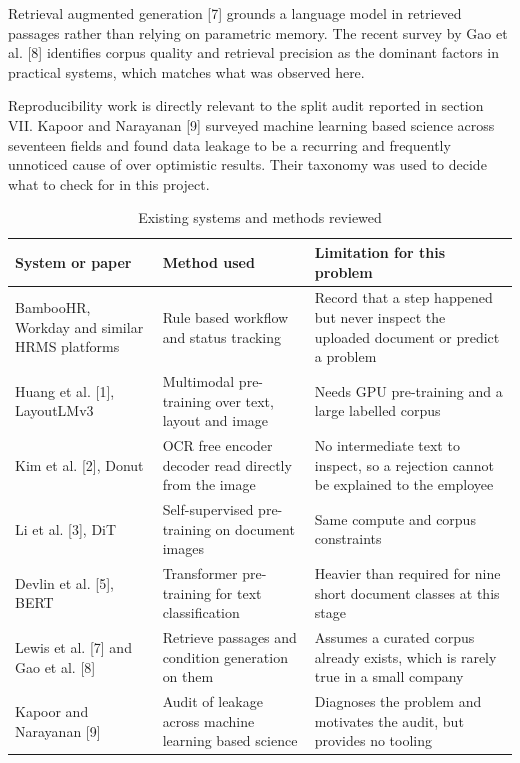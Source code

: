 \documentclass[conference]{IEEEtran}
\begin{document}
Retrieval augmented generation [7] grounds a language model in retrieved passages rather than relying on parametric memory. The recent survey by Gao et al. [8] identifies corpus quality and retrieval precision as the dominant factors in practical systems, which matches what was observed here.

Reproducibility work is directly relevant to the split audit reported in section VII. Kapoor and Narayanan [9] surveyed machine learning based science across seventeen fields and found data leakage to be a recurring and frequently unnoticed cause of over optimistic results. Their taxonomy was used to decide what to check for in this project.

\begin{table}[!t]
\centering
\caption{Existing systems and methods reviewed}
\footnotesize
\setlength{\tabcolsep}{3pt}
\begin{tabular}{p{}p{}p{}}
\toprule
\textbf{System or paper} & \textbf{Method used} & \textbf{Limitation for this problem} \\
\midrule
BambooHR, Workday and similar HRMS platforms & Rule based workflow and status tracking & Record that a step happened but never inspect the uploaded document or predict a problem \\
Huang et al. [1], LayoutLMv3 & Multimodal pre-training over text, layout and image & Needs GPU pre-training and a large labelled corpus \\
Kim et al. [2], Donut & OCR free encoder decoder read directly from the image & No intermediate text to inspect, so a rejection cannot be explained to the employee \\
Li et al. [3], DiT & Self-supervised pre-training on document images & Same compute and corpus constraints \\
Devlin et al. [5], BERT & Transformer pre-training for text classification & Heavier than required for nine short document classes at this stage \\
Lewis et al. [7] and Gao et al. [8] & Retrieve passages and condition generation on them & Assumes a curated corpus already exists, which is rarely true in a small company \\
Kapoor and Narayanan [9] & Audit of leakage across machine learning based science & Diagnoses the problem and motivates the audit, but provides no tooling \\
\bottomrule
\end{tabular}
\end{table}
\end{document}
